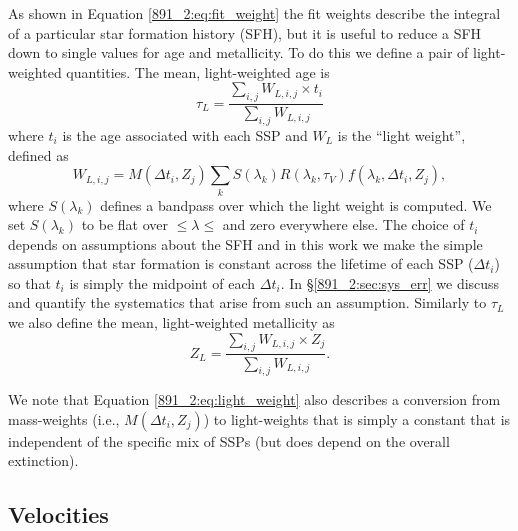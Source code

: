 As shown in Equation \ref{891_2:eq:fit_weight} the fit weights describe the
integral of a particular star formation history (SFH), but it is
useful to reduce a SFH down to single values for age and
metallicity. To do this we define a pair of light-weighted
quantities. The mean, light-weighted age is
\begin{equation}
\label{891_2:eq:MLWA}
\tau_L = \frac{\sum_{i,j} W_{L,i,j}\times t_i}{\sum_{i,j} W_{L,i,j}}
\end{equation}
where $t_i$ is the age associated with each SSP and $W_L$ is the
``light weight'', defined as
\begin{equation}
\label{891_2:eq:light_weight}
W_{L,i,j} = M(\Delta t_i,Z_j)\sum_k S(\lambda_k) R(\lambda_k, \tau_V)
f(\lambda_k, \Delta t_i, Z_j),
\end{equation}
where $S(\lambda_k)$ defines a bandpass over which the light weight is
computed. We set $S(\lambda_k)$ to be flat over 
$\leq\lambda\leq$  and zero everywhere else. The choice
of $t_i$ depends on assumptions about the SFH and in this work we make
the simple assumption that star formation is constant across the
lifetime of each SSP ($\Delta t_i$) so that $t_i$ is simply the
midpoint of each $\Delta t_i$. In \S\ref{891_2:sec:sys_err} we discuss and
quantify the systematics that arise from such an assumption. Similarly
to $\tau_L$ we also define the mean, light-weighted metallicity as
\begin{equation}
\label{891_2:eq:MLWZ}
Z_L = \frac{\sum_{i,j} W_{L,i,j}\times Z_j}{\sum_{i,j} W_{L,i,j}}.
\end{equation}

We note that Equation \ref{891_2:eq:light_weight} also describes a
conversion from mass-weights (i.e., $M(\Delta t_i, Z_j)$) to
light-weights that is simply a constant that is independent of the
specific mix of SSPs (but does depend on the overall extinction).


\subsection{Velocities}
\label{891_2:sec:vel}


